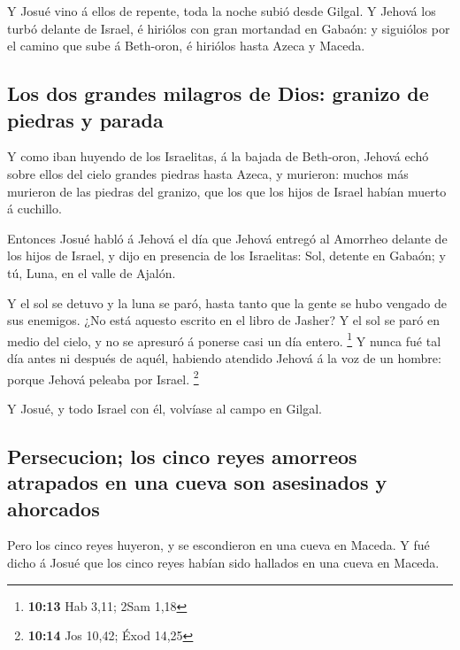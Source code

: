  Y Josué vino á ellos de repente, toda la noche subió
desde Gilgal.  Y Jehová los turbó delante de Israel, é
hiriólos con gran mortandad en Gabaón: y siguiólos por el camino que
sube á Beth-oron, é hiriólos hasta Azeca y Maceda.

\hypertarget{los-dos-grandes-milagros-de-dios-granizo-de-piedras-y-parada}{%
\subsection{Los dos grandes milagros de Dios: granizo de piedras y
parada}\label{los-dos-grandes-milagros-de-dios-granizo-de-piedras-y-parada}}

 Y como iban huyendo de los Israelitas, á la bajada de
Beth-oron, Jehová echó sobre ellos del cielo grandes piedras hasta
Azeca, y murieron: muchos más murieron de las piedras del granizo, que
los que los hijos de Israel habían muerto á cuchillo.

 Entonces Josué habló á Jehová el día que Jehová entregó
al Amorrheo delante de los hijos de Israel, y dijo en presencia de los
Israelitas: Sol, detente en Gabaón; y tú, Luna, en el valle de Ajalón.

 Y el sol se detuvo y la luna se paró, hasta tanto que la
gente se hubo vengado de sus enemigos. ¿No está aquesto escrito en el
libro de Jasher? Y el sol se paró en medio del cielo, y no se apresuró á
ponerse casi un día entero. \footnote{\textbf{10:13} Hab 3,11; 2Sam 1,18}
 Y nunca fué tal día antes ni después de aquél, habiendo
atendido Jehová á la voz de un hombre: porque Jehová peleaba por Israel.
\footnote{\textbf{10:14} Jos 10,42; Éxod 14,25}

 Y Josué, y todo Israel con él, volvíase al campo en
Gilgal.

\hypertarget{persecucion-los-cinco-reyes-amorreos-atrapados-en-una-cueva-son-asesinados-y-ahorcados}{%
\subsection{Persecucion; los cinco reyes amorreos atrapados en una cueva
son asesinados y
ahorcados}\label{persecucion-los-cinco-reyes-amorreos-atrapados-en-una-cueva-son-asesinados-y-ahorcados}}

 Pero los cinco reyes huyeron, y se escondieron en una
cueva en Maceda.  Y fué dicho á Josué que los cinco reyes
habían sido hallados en una cueva en Maceda.

